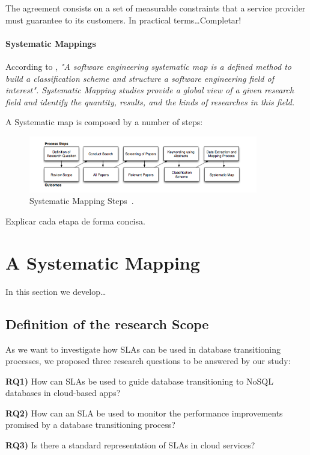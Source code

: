 \documentclass{article}
\begin{document}
The agreement consists on a set of measurable constraints that a service provider must guarantee to its customers.
In practical terms\dots {\sc Completar!}

\paragraph*{Systematic Mappings}
According to \cite{Petersen:2008:SMS:2227115.2227123}, \textit{"A software engineering systematic map is a defined method to build a classification scheme and structure a software engineering field of interest". 
Systematic Mapping studies provide a global view of a given research field and identify the quantity, results, and the kinds of researches in this field.}

A Systematic map is composed by a number of steps:
\begin{figure}[ht!]
\centering
\includegraphics[width=100mm]{pic1.png}
\caption{Systematic Mapping Steps~\cite{Petersen:2008:SMS:2227115.2227123}.\label{fig:sms}}
\end{figure}

{\sc Explicar cada etapa de forma concisa.}

\section{A Systematic Mapping}
\label{sec:asm}

In this section we develop\dots

\subsection{Definition of the research Scope}
As we want to investigate how SLAs can be used in database transitioning processes, we proposed three research questions to be answered by our study: 

\textbf{RQ1)}  How can SLAs be used to guide database transitioning to NoSQL databases in cloud-based apps? 

\textbf{RQ2)} How can an SLA be used to monitor the performance improvements promised by a database transitioning process?

\textbf{RQ3)} Is there a standard representation of SLAs in cloud services? 
\end{document}

